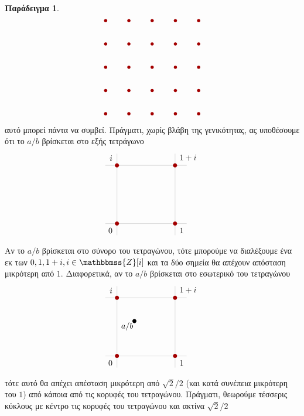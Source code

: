 \documentclass[12pt,a4paper,reqno]{amsart}
\makeatletter
\theoremstyle{definition}
\newtheorem{example}[theorem]{Παράδειγμα}
\theoremstyle{remark}
\numberwithin{theorem}{section}
\numberwithin{exercise}{section}
\numberwithin{equation}{section}
\newcommand{\ZZ}{\mathbbmss{Z}}
\def\mathcolor#1#{\@mathcolor{#1}}
\def\@mathcolor#1#2#3{%
  \protect\leavevmode
  \begingroup
    \color#1{#2}#3%
  \endgroup
}
\makeatother
\begin{document}
\begin{example}
\[\begin{tikzpicture}[scale=1]
        \foreach \x in {-2,-1,0,1,2}
            \foreach \y in {-2,-1,0,1,2}
            \fill[darkcandyapplered] (\x,\y) circle (2pt);
    \end{tikzpicture}
    \]
    αυτό μπορεί πάντα να συμβεί. Πράγματι, χωρίς βλάβη της γενικότητας, ας υποθέσουμε ότι το $a/b$ βρίσκεται στο εξής τετράγωνο
    \[
    \begin{tikzpicture}[scale=2.5]
        \draw[step=1cm,gray,very thin] (0.8,0.8) grid (2.2,2.2);
        \fill[darkcandyapplered](1, 1) circle (1pt) node[below left=2pt]{$\mathcolor{black}{0}$};
        \fill[darkcandyapplered](2, 1) circle (1pt) node[below right=2pt]{$\mathcolor{black}{1}$};
        \fill[darkcandyapplered](1, 2) circle (1pt) node[above left=2pt]{$\mathcolor{black}{i}$};
        \fill[darkcandyapplered](2, 2) circle (1pt) node[above right=2pt]{$\mathcolor{black}{1+i}$};
    \end{tikzpicture}
    \]
    Αν το $a/b$ βρίσκεται στο σύνορο του τετραγώνου, τότε μπορούμε να διαλέξουμε ένα εκ των $0, 1, 1 + i, i \in \ZZ[i]$ και τα δύο σημεία θα απέχουν απόσταση μικρότερη από $1$. Διαφορετικά, αν το $a/b$ βρίσκεται στο εσωτερικό του τετραγώνου
    \[
    \begin{tikzpicture}[scale=2.5]
        \draw[step=1cm,gray,very thin] (0.8,0.8) grid (2.2,2.2);
        \fill[darkcandyapplered](1, 1) circle (1pt) node[below left=2pt]{$\mathcolor{black}{0}$};
        \fill[darkcandyapplered](2, 1) circle (1pt) node[below right=2pt]{$\mathcolor{black}{1}$};
        \fill[darkcandyapplered](1, 2) circle (1pt) node[above left=2pt]{$\mathcolor{black}{i}$};
        \fill[darkcandyapplered](2, 2) circle (1pt) node[above right=2pt]{$\mathcolor{black}{1+i}$};
        \fill(1.3, 1.6) circle (1pt) node[below left=-2pt]{$a/b$};
    \end{tikzpicture}
    \]
    τότε αυτό θα απέχει απέσταση μικρότερη από $\sqrt{2}/2$ (και κατά συνέπεια μικρότερη του $1$) από κάποια από τις κορυφές του τετραγώνου. Πράγματι, θεωρούμε τέσσερις κύκλους με κέντρο τις κορυφές του τετραγώνου και ακτίνα $\sqrt{2}/2$

\end{example}
\end{document}
